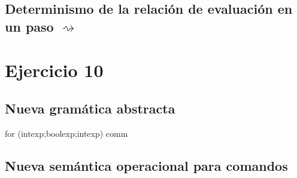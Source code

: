 \documentclass[11pt]{article}
\begin{document}
\subsection*{Determinismo de la relaci\'on de evaluaci\'on en un paso $\rightsquigarrow$}

\section*{Ejercicio 10}

\subsection*{Nueva gram\'atica abstracta}
for (intexp;boolexp;intexp) comm

\subsection*{Nueva sem\'antica operacional para comandos}
\end{document}
